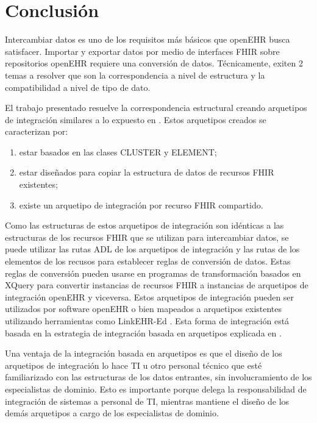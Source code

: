 \section{Conclusión}

Intercambiar datos es uno de los requisitos más básicos que openEHR busca satisfacer. Importar y exportar datos por medio de interfaces FHIR sobre repositorios openEHR requiere una conversión de datos. Técnicamente, exiten 2 temas a resolver que son la correspondencia a nivel de estructura y la compatibilidad a nivel de tipo de dato.

El trabajo presentado resuelve la correspondencia estructural creando arquetipos de integración similares a lo expuesto en \cite{openEHRArchitecture}. Estos arquetipos creados se caracterizan por:

\begin{enumerate}
  \item estar basados en las clases CLUSTER y ELEMENT;
  \item estar diseñados para copiar la estructura de datos de recursos FHIR existentes;
  \item existe un arquetipo de integración por recurso FHIR compartido.
\end{enumerate}

Como las estructuras de estos arquetipos de integración son idénticas a las estructuras de los recursos FHIR que se utilizan para intercambiar datos, se puede utilizar las rutas ADL de los arquetipos de integración y las rutas de los elementos de los recusos para establecer reglas de conversión de datos. Estas reglas de conversión pueden usarse en programas de transformación basados en XQuery para convertir instancias de recursos FHIR a instancias de arquetipos de integración openEHR y viceversa. Estos arquetipos de integración pueden ser utilizados por software openEHR o bien mapeados a arquetipos existentes utilizando herramientas como LinkEHR-Ed \cite{Maldonado09}. Esta forma de integración está basada en la estrategia de integración basada en arquetipos explicada en \cite{openEHRIntegration}.

Una ventaja de la integración basada en arquetipos es que el diseño de los arquetipos de integración lo hace TI u otro personal técnico que esté familiarizado con las estructuras de los datos entrantes, sin involucramiento de los especialistas de dominio. Esto es importante porque delega la responsabilidad de integración de sistemas a personal de TI, mientras mantiene el diseño de los demás arquetipos a cargo de los especialistas de dominio.

